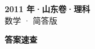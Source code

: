 \documentclass[zihao=-4, a4paper]{ctexart}
\begin{document}
\begin{center}
  {\Large\bfseries 2011 年·山东卷·理科}\\[4pt]
  {\large 数学 · 简答版}
\end{center}
\medskip
{}

\clearpage
{}
\begin{center}{\Large\bfseries 答案速查}\end{center}
\medskip

\end{document}
